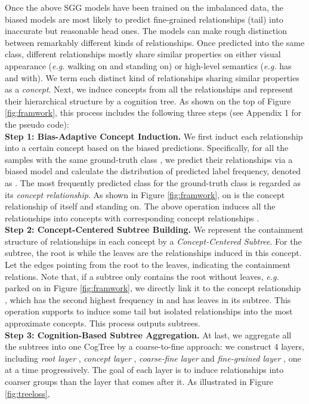 \documentclass[letterpaper]{article} \usepackage{aaai21}  \usepackage{times}  \usepackage{helvet} \usepackage{courier}  \usepackage[hyphens]{url}  \usepackage{graphicx} \urlstyle{rm} \def\UrlFont{\rm}  \usepackage{natbib}  \usepackage{caption} \frenchspacing  \setlength{\pdfpagewidth}{8.5in}  \setlength{\pdfpageheight}{11in}  \usepackage{amsmath,amsthm}
\begin{document}
Once the above SGG models have been trained on the imbalanced data, the biased models are most likely to predict fine-grained relationships (tail) into inaccurate but reasonable head ones. The models can make rough distinction between remarkably different kinds of relationships. Once predicted into the same class, different relationships mostly share similar properties on either visual appearance (\textit{e.g.} {\ttfamily walking on} and {\ttfamily standing on}) or high-level semantics (\textit{e.g.} {\ttfamily has} and {\ttfamily with}).
We term each distinct kind of relationships sharing similar properties as a \textit{concept}.  
Next, we induce concepts from all the relationships and represent their hierarchical structure by a cognition tree. As shown on the top of Figure \ref{fig:framwork}, this process includes the following three steps (see Appendix 1 for the pseudo code): 
\\
\textbf{Step 1: Bias-Adaptive Concept Induction.} We first induct each relationship into a certain concept based on the biased predictions. Specifically, for all the samples with the same ground-truth class , we predict their relationships via a biased model and calculate the distribution of predicted label frequency, denoted as . The most frequently predicted class for the ground-truth class  is regarded as its \textit{concept relationship}. As shown in Figure \ref{fig:framwork}, {\ttfamily on} is the concept relationship of itself and {\ttfamily standing on}. The above operation induces all the relationships into  concepts with corresponding concept relationships  .  
\\
\textbf{Step 2: Concept-Centered Subtree Building.} We represent the containment structure of relationships in each concept by a \textit{Concept-Centered Subtree}. For the  subtree, the root is  while the leaves are the relationships induced in this concept. Let the edges pointing from the root to the leaves, indicating the containment relations. Note that, if a subtree only contains the root  without leaves, \textit{e.g.} {\ttfamily parked on} in Figure \ref{fig:framwork}, we directly link it to the concept relationship , which has the second highest frequency in  and has leaves in its subtree. This operation supports to induce some tail but isolated relationships 
into the most approximate concepts. This process outputs  subtrees.    
\\
\textbf{Step 3: Cognition-Based Subtree Aggregation.} At last, we aggregate all the  subtrees into one CogTree by a coarse-to-fine approach: we construct 4 layers, including \textit{root layer} , \textit{concept layer} ,  \textit{coarse-fine layer}  and \textit{fine-grained layer} , one at a time progressively. The goal of each layer is to induce relationships into coarser groups than the layer that comes after it. As illustrated in Figure \ref{fig:treeloss},   
\end{document}
